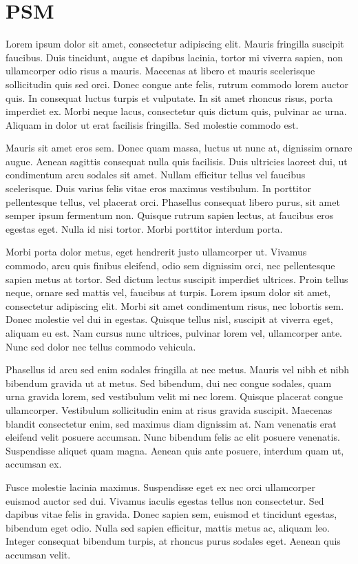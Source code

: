 \section{PSM}
Lorem ipsum dolor sit amet, consectetur adipiscing elit. Mauris fringilla suscipit faucibus. Duis tincidunt, augue et dapibus lacinia, tortor mi viverra sapien, non ullamcorper odio risus a mauris. Maecenas at libero et mauris scelerisque sollicitudin quis sed orci. Donec congue ante felis, rutrum commodo lorem auctor quis. In consequat luctus turpis et vulputate. In sit amet rhoncus risus, porta imperdiet ex. Morbi neque lacus, consectetur quis dictum quis, pulvinar ac urna. Aliquam in dolor ut erat facilisis fringilla. Sed molestie commodo est.

Mauris sit amet eros sem. Donec quam massa, luctus ut nunc at, dignissim ornare augue. Aenean sagittis consequat nulla quis facilisis. Duis ultricies laoreet dui, ut condimentum arcu sodales sit amet. Nullam efficitur tellus vel faucibus scelerisque. Duis varius felis vitae eros maximus vestibulum. In porttitor pellentesque tellus, vel placerat orci. Phasellus consequat libero purus, sit amet semper ipsum fermentum non. Quisque rutrum sapien lectus, at faucibus eros egestas eget. Nulla id nisi tortor. Morbi porttitor interdum porta.

Morbi porta dolor metus, eget hendrerit justo ullamcorper ut. Vivamus commodo, arcu quis finibus eleifend, odio sem dignissim orci, nec pellentesque sapien metus at tortor. Sed dictum lectus suscipit imperdiet ultrices. Proin tellus neque, ornare sed mattis vel, faucibus at turpis. Lorem ipsum dolor sit amet, consectetur adipiscing elit. Morbi sit amet condimentum risus, nec lobortis sem. Donec molestie vel dui in egestas. Quisque tellus nisl, suscipit at viverra eget, aliquam eu est. Nam cursus nunc ultrices, pulvinar lorem vel, ullamcorper ante. Nunc sed dolor nec tellus commodo vehicula.

Phasellus id arcu sed enim sodales fringilla at nec metus. Mauris vel nibh et nibh bibendum gravida ut at metus. Sed bibendum, dui nec congue sodales, quam urna gravida lorem, sed vestibulum velit mi nec lorem. Quisque placerat congue ullamcorper. Vestibulum sollicitudin enim at risus gravida suscipit. Maecenas blandit consectetur enim, sed maximus diam dignissim at. Nam venenatis erat eleifend velit posuere accumsan. Nunc bibendum felis ac elit posuere venenatis. Suspendisse aliquet quam magna. Aenean quis ante posuere, interdum quam ut, accumsan ex.

Fusce molestie lacinia maximus. Suspendisse eget ex nec orci ullamcorper euismod auctor sed dui. Vivamus iaculis egestas tellus non consectetur. Sed dapibus vitae felis in gravida. Donec sapien sem, euismod et tincidunt egestas, bibendum eget odio. Nulla sed sapien efficitur, mattis metus ac, aliquam leo. Integer consequat bibendum turpis, at rhoncus purus sodales eget. Aenean quis accumsan velit.